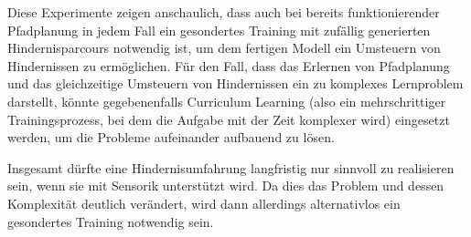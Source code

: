 Diese Experimente zeigen anschaulich, dass auch bei bereits funktionierender Pfadplanung in jedem Fall ein gesondertes Training mit zufällig generierten Hindernisparcours notwendig ist, um dem fertigen Modell ein Umsteuern von Hindernissen zu ermöglichen.
Für den Fall, dass das Erlernen von Pfadplanung und das gleichzeitige Umsteuern von Hindernissen ein zu komplexes Lernproblem darstellt, könnte gegebenenfalls Curriculum Learning (also ein mehrschrittiger Trainingsprozess, bei dem die Aufgabe mit der Zeit komplexer wird) eingesetzt werden, um die Probleme aufeinander aufbauend zu lösen.

Insgesamt dürfte eine Hindernisumfahrung langfristig nur sinnvoll zu realisieren sein, wenn sie mit Sensorik unterstützt wird.
Da dies das Problem und dessen Komplexität deutlich verändert, wird dann allerdings alternativlos ein gesondertes Training notwendig sein.